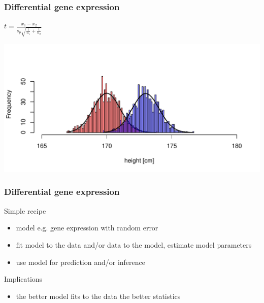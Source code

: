 \documentclass{beamer}\usepackage[]{graphicx}\usepackage[]{color}
\makeatletter
\def\maxwidth{ %
  \ifdim\Gin@nat@width>\linewidth
    \linewidth
  \else
    \Gin@nat@width
  \fi
}
\newenvironment{knitrout}{}{} %
\makeatother
\begin{document}
\begin{frame}
\frametitle{Differential gene expression}
\begin{flushright}
$t=\frac{x_1-x_2}{s_p\sqrt{\frac{1}{n_1}+\frac{1}{n_2}}}$
\end{flushright}
\begin{knitrout}
\color{fgcolor}
\includegraphics[width=\maxwidth]{figure/ttest-1} 

\end{knitrout}
\end{frame}


\begin{frame}
\frametitle{Differential gene expression}
\begin{block}{Simple recipe}
\begin{itemize}
\item model e.g. gene expression with random error
\item fit model to the data and/or data to the model, estimate model parameters
\item use model for prediction and/or inference
\end{itemize}
\end{block}
\begin{block}{Implications}
\begin{itemize}
\item the better model fits to the data the better statistics
\end{itemize}
\end{block}
\end{frame}
\end{document}

